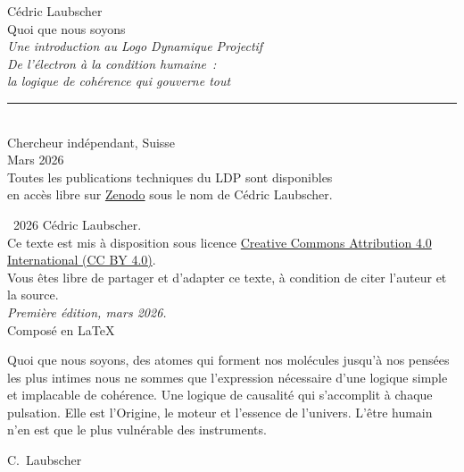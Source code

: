 \documentclass[12pt, a4paper, openright]{book}
\begin{document}
\begin{titlepage}
  \centering
  \vspace*{3cm}
  {\fontsize{11}{13}\selectfont Cédric Laubscher}\\[1.2cm]
  {\fontsize{30}{36}\selectfont\normalfont Quoi que nous soyons}\\[0.6cm]
  {\fontsize{16}{20}\selectfont\itshape
    Une introduction au Logo Dynamique Projectif}\\[0.4cm]
  {\fontsize{13}{16}\selectfont\itshape
    De l'électron à la condition humaine~:\\
    la logique de cohérence qui gouverne tout}\\[3cm]
  \rule{0.45\textwidth}{0.4pt}\\[0.8cm]
  {\small Chercheur indépendant, Suisse}\\[0.3cm]
  {\small Mars 2026}\\[1.5cm]
  \vfill
  {\footnotesize
    Toutes les publications techniques du LDP sont disponibles\\
    en accès libre sur \href{https://zenodo.org}{Zenodo}
    sous le nom de Cédric Laubscher.}
\end{titlepage}

\thispagestyle{empty}
\vspace*{\fill}
\begin{flushleft}
  \small
  \textcopyright\ 2026 Cédric Laubscher.\\[0.4em]
  Ce texte est mis à disposition sous licence
  \href{https://creativecommons.org/licenses/by/4.0/}{%
    Creative Commons Attribution 4.0 International (CC BY 4.0)}.\\[0.4em]
  Vous êtes libre de partager et d'adapter ce texte,
  à condition de citer l'auteur et la source.\\[1.2em]
  \textit{Première édition, mars 2026.}\\[0.4em]
  Composé en \LaTeX\ 
\end{flushleft}
\vspace*{\fill}
\newpage

\thispagestyle{empty}
\vspace*{4cm}
\epigraph{%
  Quoi que nous soyons, des atomes qui forment nos molécules jusqu'à nos pensées les plus intimes nous ne sommes que l'expression nécessaire d'une logique simple et implacable de cohérence. Une logique de causalité qui s'accomplit à chaque pulsation. Elle est l'Origine, le moteur et l'essence de l'univers. L'être humain n'en est que le plus vulnérable des instruments.%
}{C.~Laubscher}
\newpage
\end{document}
